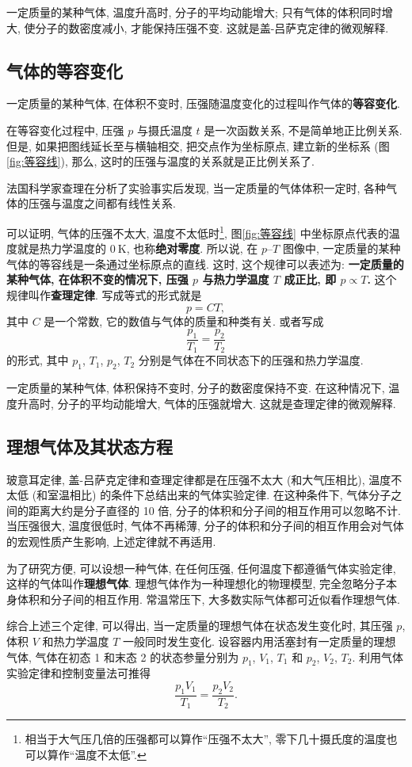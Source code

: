 \documentclass[UTF8,openany,fontset=fandol]{ctexbook}
\theoremstyle{chinesetextbook}
\newcommand{\unit}[1]{\ \mathrm{#1}}
\begin{document}
一定质量的某种气体, 温度升高时, 分子的平均动能增大; 只有气体的体积同时增大, 使分子的数密度减小, 才能保持压强不变. 这就是盖-吕萨克定律的微观解释.
\subsection{气体的等容变化}
一定质量的某种气体, 在体积不变时, 压强随温度变化的过程叫作气体的\textbf{等容变化}.

在等容变化过程中, 压强 $p$ 与摄氏温度 $t$ 是一次函数关系, 不是简单地正比例关系. 但是, 如果把图线延长至与横轴相交, 把交点作为坐标原点, 建立新的坐标系 (图\ref{fig:等容线}), 那么, 这时的压强与温度的关系就是正比例关系了.

法国科学家查理在分析了实验事实后发现, 当一定质量的气体体积一定时, 各种气体的压强与温度之间都有线性关系.

可以证明, 气体的压强不太大, 温度不太低时\footnote{相当于大气压几倍的压强都可以算作“压强不太大”, 零下几十摄氏度的温度也可以算作“温度不太低”.}, 图\ref{fig:等容线} 中坐标原点代表的温度就是热力学温度的 $0\unit{K}$, 也称\textbf{绝对零度}. 所以说, 在 $p$–$T$ 图像中, 一定质量的某种气体的等容线是一条通过坐标原点的直线. 这时, 这个规律可以表述为: \textbf{一定质量的某种气体, 在体积不变的情况下, 压强 $p$ 与热力学温度 $T$ 成正比, 即 $p\propto T$.} 这个规律叫作\textbf{查理定律}. 写成等式的形式就是
\[
p=CT,
\]
其中 $C$ 是一个常数, 它的数值与气体的质量和种类有关. 或者写成
\[
\frac{p_1}{T_1}=\frac{p_2}{T_2}
\]
的形式, 其中 $p_1$, $T_1$, $p_2$, $T_2$ 分别是气体在不同状态下的压强和热力学温度.

一定质量的某种气体, 体积保持不变时, 分子的数密度保持不变. 在这种情况下, 温度升高时, 分子的平均动能增大, 气体的压强就增大. 这就是查理定律的微观解释.
\subsection{理想气体及其状态方程}
玻意耳定律, 盖-吕萨克定律和查理定律都是在压强不太大 (和大气压相比), 温度不太低 (和室温相比) 的条件下总结出来的气体实验定律. 在这种条件下, 气体分子之间的距离大约是分子直径的 10 倍, 分子的体积和分子间的相互作用可以忽略不计. 当压强很大, 温度很低时, 气体不再稀薄, 分子的体积和分子间的相互作用会对气体的宏观性质产生影响, 上述定律就不再适用.

为了研究方便, 可以设想一种气体, 在任何压强, 任何温度下都遵循气体实验定律, 这样的气体叫作\textbf{理想气体}. 理想气体作为一种理想化的物理模型, 完全忽略分子本身体积和分子间的相互作用. 常温常压下, 大多数实际气体都可近似看作理想气体.

综合上述三个定律, 可以得出, 当一定质量的理想气体在状态发生变化时, 其压强 $p$, 体积 $V$ 和热力学温度 $T$ 一般同时发生变化. 设容器内用活塞封有一定质量的理想气体, 气体在初态 1 和末态 2 的状态参量分别为 $p_1$, $V_1$, $T_1$ 和 $p_2$, $V_2$, $T_2$. 利用气体实验定律和控制变量法可推得
\[
\frac{p_1V_1}{T_1}=\frac{p_2V_2}{T_2}.
\]
\end{document}

